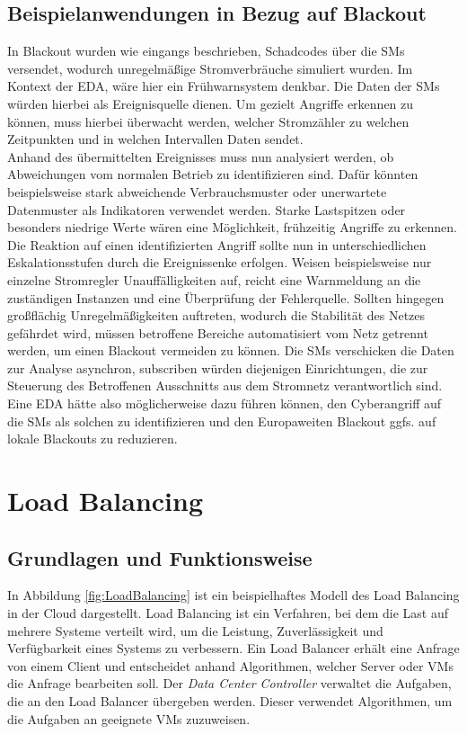 \documentclass[a4paper,12pt]{article}
\let\stdsection\section
\renewcommand\section{\newpage\stdsection}
\begin{document}
\subsection{Beispielanwendungen in Bezug auf Blackout}
In Blackout wurden wie eingangs beschrieben, Schadcodes über die \acp{SM} versendet, wodurch unregelmäßige Stromverbräuche simuliert wurden. Im Kontext der \ac{EDA}, wäre hier ein Frühwarnsystem denkbar. Die Daten der \acp{SM} würden hierbei als Ereignisquelle dienen. Um gezielt Angriffe erkennen zu können, muss hierbei überwacht werden, welcher Stromzähler zu welchen Zeitpunkten und in welchen Intervallen Daten sendet.\\
Anhand des übermittelten Ereignisses muss nun analysiert werden, ob Abweichungen vom normalen Betrieb zu identifizieren sind. Dafür könnten beispielsweise stark abweichende Verbrauchsmuster oder unerwartete Datenmuster als Indikatoren verwendet werden. Starke Lastspitzen oder besonders niedrige Werte wären eine Möglichkeit, frühzeitig Angriffe zu erkennen.\\
Die Reaktion auf einen identifizierten Angriff sollte nun in unterschiedlichen Eskalationsstufen durch die Ereignissenke erfolgen. Weisen beispielsweise nur einzelne Stromregler Unauffälligkeiten auf, reicht eine Warnmeldung an die zuständigen Instanzen und eine Überprüfung der Fehlerquelle. Sollten hingegen großflächig Unregelmäßigkeiten auftreten, wodurch die Stabilität des Netzes gefährdet wird, müssen betroffene Bereiche automatisiert vom Netz getrennt werden, um einen Blackout vermeiden zu können. Die \acp{SM} verschicken die Daten zur Analyse asynchron, subscriben würden diejenigen Einrichtungen, die zur Steuerung des Betroffenen Ausschnitts aus dem Stromnetz verantwortlich sind.\\
Eine \ac{EDA} hätte also möglicherweise dazu führen können, den Cyberangriff auf die \acp{SM} als solchen zu identifizieren und den Europaweiten Blackout ggfs. auf lokale Blackouts zu reduzieren.


\section{Load Balancing}
\subsection{Grundlagen und Funktionsweise}
In Abbildung \ref{fig:LoadBalancing} ist ein beispielhaftes Modell des Load Balancing in der Cloud dargestellt. Load Balancing ist ein Verfahren, bei dem die Last auf mehrere Systeme verteilt wird, um die Leistung, Zuverlässigkeit und Verfügbarkeit eines Systems zu verbessern.
Ein Load Balancer erhält eine Anfrage von einem Client und entscheidet anhand Algorithmen, welcher Server oder \acp{VM} die Anfrage bearbeiten soll. 
Der \textit{Data Center Controller} verwaltet die Aufgaben, die an den Load Balancer übergeben werden. Dieser verwendet Algorithmen, um die Aufgaben an geeignete \acp{VM} zuzuweisen.
\end{document}

